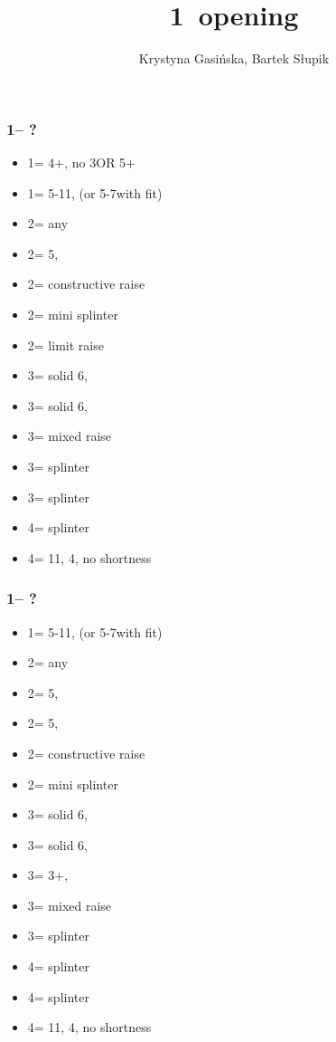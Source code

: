 \documentclass[12pt, a4paper]{article}
\title{1\majs\ opening}
\author{Krystyna Gasińska, Bartek Słupik}
\begin{document}
\maketitle


\subsubsection*{1\hearts -- ?}
\begin{itemize}
    \item 1\spades = 4+\spades, no 3\hearts OR 5\hearts + \gf
    \item 1\nt = 5-11\hcp, (or 5-7\hcp with \hearts fit)
    \item 2\clubs = any \gf
    \item 2\diams = 5\diams, \gf
    \item 2\hearts = constructive raise
    \item 2\spades = mini splinter
    \item 2\nt = limit raise
    \item 3\clubs = solid 6\clubs, \inv
    \item 3\diams = solid 6\diams, \inv
    \item 3\hearts = mixed raise
    \item 3\spades = splinter \spades
    \item 3\nt = splinter \diams
    \item 4\clubs = splinter \clubs
    \item 4\diams = 11\hcp, 4\hearts, no shortness
\end{itemize}

\subsubsection*{1\spades -- ?}
\begin{itemize}
    \item 1\nt = 5-11\hcp, (or 5-7\hcp with \spades fit)
    \item 2\clubs = any \gf
    \item 2\diams = 5\diams, \gf
    \item 2\hearts = 5\hearts, \gf
    \item 2\spades = constructive raise
    \item 2\nt = mini splinter
    \item 3\clubs = solid 6\clubs, \inv
    \item 3\diams = solid 6\diams, \inv
    \item 3\hearts = 3+\spades, \inv
    \item 3\spades = mixed raise
    \item 3\nt = splinter \hearts
    \item 4\clubs = splinter \clubs
    \item 4\diams = splinter \diams
    \item 4\hearts = 11\hcp, 4\spades, no shortness
\end{itemize}
\end{document}
